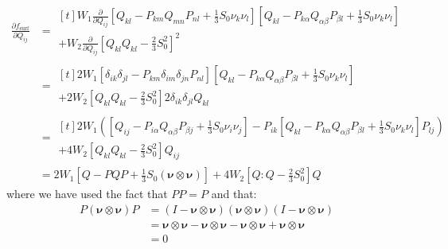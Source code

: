 \documentclass[reqno]{article}
\newcommand{\fs}{f_\text{surf}}
\begin{document}
\begin{equation}
\begin{split}
    \frac{\partial \fs}{\partial Q_{ij}}
    &=
    \begin{multlined}[t]
        W_1
        \frac{\partial}{\partial Q_{ij}}
        \left[ Q_{kl} - P_{km} Q_{mn} P_{nl} + \frac13 S_0 \nu_k \nu_l\right] 
        \left[ Q_{kl} - P_{k\alpha} Q_{\alpha \beta} P_{\beta l} + \frac13 S_0 \nu_k \nu_l\right] \\
        + 
        W_2 
        \frac{\partial}{\partial Q_{ij}}
        \left[ Q_{kl} Q_{kl} - \frac23 S_0^2 \right]^2
    \end{multlined} \\
    &=
    \begin{multlined}[t]
        2 W_1 \left[ \delta_{ik} \delta_{jl} - P_{km} \delta_{im} \delta_{jn} P_{nl} \right]
        \left[ Q_{kl} - P_{k\alpha} Q_{\alpha \beta} P_{\beta l} + \frac13 S_0 \nu_k \nu_l\right] \\
        + 
        2 W_2 \left[ Q_{kl} Q_{kl} - \frac23 S_0^2 \right] 2 \delta_{ik} \delta_{jl} Q_{kl}
    \end{multlined} \\
    &=
    \begin{multlined}[t]
        2 W_1 \left(
        \left[ Q_{ij} - P_{i\alpha} Q_{\alpha \beta} P_{\beta j} + \frac13 S_0 \nu_i \nu_j\right]
        - P_{ik} \left[ Q_{kl} - P_{k\alpha} Q_{\alpha \beta} P_{\beta l} + \frac13 S_0 \nu_k \nu_l\right] P_{lj}
        \right) \\
        + 
        4 W_2 \left[ Q_{kl} Q_{kl} - \frac23 S_0^2 \right] Q_{ij}
    \end{multlined} \\
    &=
    2 W_1 \left[ Q - PQP + \frac13 S_0 \left( \boldsymbol\nu \otimes \boldsymbol\nu \right) \right]
    + 4 W_2 \left[ Q : Q - \frac23 S_0^2 \right] Q
\end{split}
\end{equation}
where we have used the fact that $PP = P$ and that:
\begin{equation}
\begin{split}
    P \left( \boldsymbol{\nu} \otimes \boldsymbol{\nu} \right) P
    &= 
    \left(I - \boldsymbol{\nu} \otimes \boldsymbol{\nu}\right)
    \left( \boldsymbol{\nu} \otimes \boldsymbol{\nu} \right)
    \left(I - \boldsymbol{\nu} \otimes \boldsymbol{\nu}\right) \\
    &=
    \boldsymbol{\nu} \otimes \boldsymbol{\nu}
    - \boldsymbol{\nu} \otimes \boldsymbol{\nu}
    - \boldsymbol{\nu} \otimes \boldsymbol{\nu}
    + \boldsymbol{\nu} \otimes \boldsymbol{\nu} \\
    &=
    0
\end{split}
\end{equation}
\end{document}
